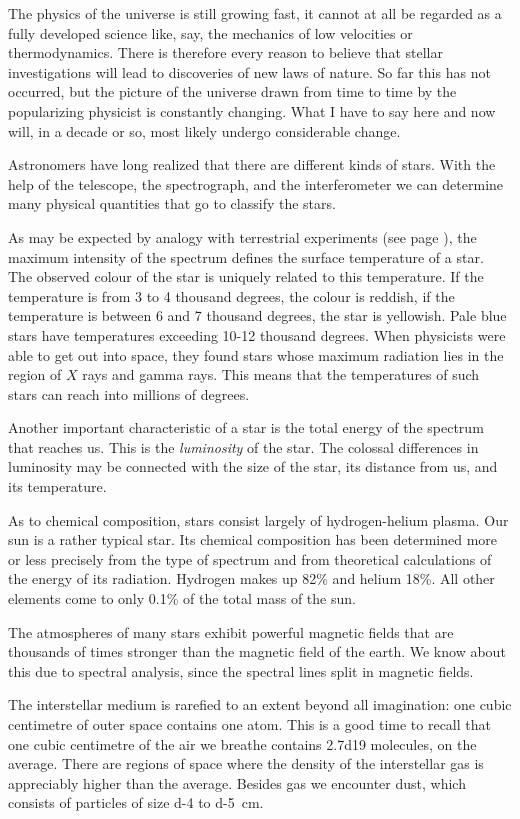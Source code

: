 The physics of the universe is still growing fast, it cannot at all be regarded as a fully developed science like, say, the mechanics of low velocities or thermodynamics. There is therefore every reason to believe that stellar investigations will lead to discoveries of new laws of nature. So far this has not occurred, but the picture of the universe drawn from time to time by the popularizing physicist is constantly changing. What I have to say here and now will, in a decade or so, most likely undergo considerable change.

Astronomers have long realized that there are different kinds of stars. With the help of the telescope, the spec­trograph, and the interferometer we can determine many physical quantities that go to classify the stars.

As may be expected by analogy with terrestrial experi­ments (see page \pageref{bbr-ref}), the maximum intensity of the spec­trum defines the surface temperature of a star. The ob­served colour of the star is uniquely related to this tempera­ture. If the temperature is from 3 to 4 thousand degrees, the colour is reddish, if the temperature is between 6 and 7 thousand degrees, the star is yellowish. Pale blue stars have temperatures exceeding 10-12 thousand degrees. When physicists were able to get out into space, they found stars whose maximum radiation lies in the region of $X$ rays and gamma rays. This means that the tempera­tures of such stars can reach into millions of degrees.

Another important characteristic of a star is the total energy of the spectrum that reaches us. This is the \emph{lumi­nosity} of the star. The colossal differences in luminosity may be connected with the size of the star, its distance from us, and its temperature.

As to chemical composition, stars consist largely of hy­drogen-helium plasma. Our sun is a rather typical star. Its chemical composition has been determined more or less precisely from the type of spectrum and from theoretical calculations of the energy of its radiation. Hydrogen makes up 82\% and helium 18\%. All other elements come to only 0.1\% of the total mass of the sun.

The atmospheres of many stars exhibit powerful mag­netic fields that are thousands of times stronger than the magnetic field of the earth. We know about this due to spectral analysis, since the spectral lines split in magnetic fields.

The interstellar medium is rarefied to an extent beyond all imagination: one cubic centimetre of outer space con­tains one atom. This is a good time to recall that one cubic centimetre of the air we breathe contains \num{2.7d19} molecules, on the average. There are regions of space where the density of the interstellar gas is appreciably higher than the average. Besides gas we encounter dust, which consists of particles of size \num{d-4} to \SI{d-5}{\centi\meter}.

